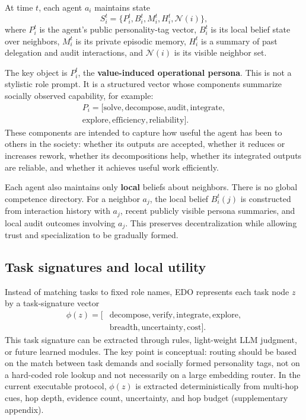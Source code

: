 \documentclass[11pt]{article}
\begin{document}
At time $t$, each agent $a_i$ maintains state
\[
S_i^t = \{P_i^t, B_i^t, M_i^t, H_i^t, \mathcal{N}(i)\},
\]
where $P_i^t$ is the agent's public personality-tag vector, $B_i^t$ is its local belief state over neighbors, $M_i^t$ is its private episodic memory, $H_i^t$ is a summary of past delegation and audit interactions, and $\mathcal{N}(i)$ is its visible neighbor set.

The key object is $P_i^t$, the \textbf{value-induced operational persona}. This is not a stylistic role prompt. It is a structured vector whose components summarize socially observed capability, for example:
\begin{multline*}
P_i = [\text{solve}, \text{decompose}, \text{audit}, \text{integrate},\\
\text{explore}, \text{efficiency}, \text{reliability}].
\end{multline*}
These components are intended to capture how useful the agent has been to others in the society: whether its outputs are accepted, whether it reduces or increases rework, whether its decompositions help, whether its integrated outputs are reliable, and whether it achieves useful work efficiently.

Each agent also maintains only \textbf{local} beliefs about neighbors. There is no global competence directory. For a neighbor $a_j$, the local belief $B_i^t(j)$ is constructed from interaction history with $a_j$, recent publicly visible persona summaries, and local audit outcomes involving $a_j$. This preserves decentralization while allowing trust and specialization to be gradually formed.

\subsection{Task signatures and local utility}

Instead of matching tasks to fixed role names, EDO represents each task node $z$ by a task-signature vector
\[
\begin{aligned}
\phi(z)=[&\text{decompose},\text{verify},\text{integrate},\text{explore},\\
&\text{breadth},\text{uncertainty},\text{cost}].
\end{aligned}
\]
This task signature can be extracted through rules, light-weight LLM judgment, or future learned modules. The key point is conceptual: routing should be based on the match between task demands and socially formed personality tags, not on a hard-coded role lookup and not necessarily on a large embedding router. In the current executable protocol, $\phi(z)$ is extracted deterministically from multi-hop cues, hop depth, evidence count, uncertainty, and hop budget (supplementary appendix).
\end{document}
